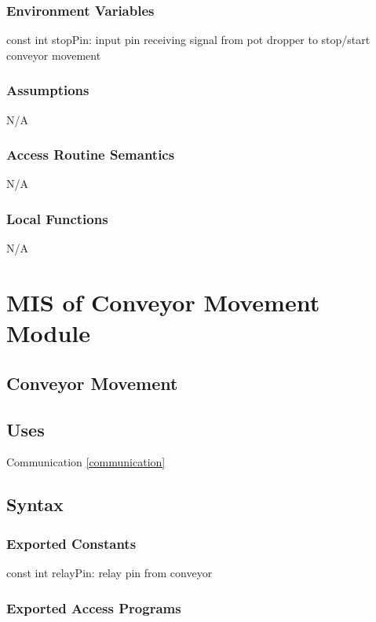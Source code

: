 \documentclass[12pt, titlepage]{article}
\begin{document}
\subsubsection{Environment Variables}

const int stopPin: input pin receiving signal from pot dropper to stop/start conveyor movement\\

\subsubsection{Assumptions}

N/A
\subsubsection{Access Routine Semantics}

N/A
\subsubsection{Local Functions}

N/A

\section{MIS of Conveyor Movement Module} \label{conveyorMovement}


\subsection{Conveyor Movement}


\subsection{Uses}
Communication \ref{communication}

\subsection{Syntax}

\subsubsection{Exported Constants}
const int relayPin: relay pin from conveyor\\
\subsubsection{Exported Access Programs}
\end{document}
